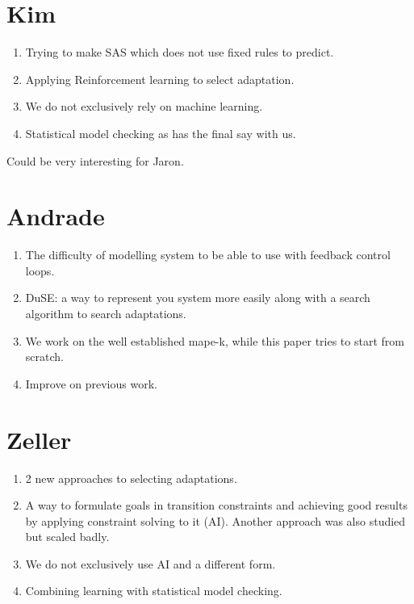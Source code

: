 \documentclass[12pt]{article}
\begin{document}
\section{Kim}
\begin{enumerate}
    \item Trying to make SAS which does not use fixed rules to predict.
    \item Applying Reinforcement learning to select adaptation.
    \item We do not exclusively rely on machine learning.
    \item Statistical model checking as has the final say with us.
\end{enumerate}
Could be very interesting for Jaron.

\section{Andrade}
\begin{enumerate}
    \item The difficulty of modelling system to be able to use with feedback control loops.
    \item DuSE: a way to represent you system more easily along with a search algorithm to search adaptations.
    \item We work on the well established mape-k, while this paper tries to start from scratch.
    \item Improve on previous work.
\end{enumerate}

\section{Zeller}
\begin{enumerate}
    \item 2 new approaches to selecting adaptations.
    \item A way to formulate goals in transition constraints and achieving good results by applying constraint solving to it (AI). Another approach was also studied but scaled badly.
    \item We do not exclusively use AI and a different form.
    \item Combining learning with statistical model checking.
\end{enumerate}
\end{document}
